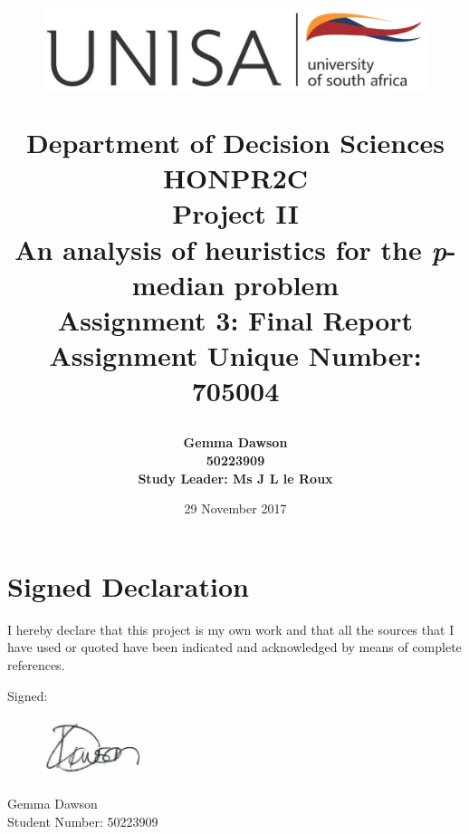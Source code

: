 \documentclass[11pt]{article}
\newcommand{\np}{\newpage}
\begin{document}
	\title{
		\begin{figure}[!htb]
			\begin{center}
				\includegraphics[width=12cm]{unisa.png}
			\end{center}
		\end{figure}
		Department of Decision Sciences\\[3mm]
		HONPR2C\\
		Project II \\[2cm]		
		{\Huge \textbf{An analysis of heuristics for the \emph{p}-median problem}}\\[15mm]
		Assignment 3: Final Report\\[3mm]
		Assignment Unique Number: 705004\\[2cm]
	}
	\author{\textbf{\Large Gemma Dawson}\\[3mm]
		\textbf{\Large 50223909}\\[3mm]
		\textbf{Study Leader: Ms J L le Roux}
	}
	\date{\Large 29 November 2017}	
	\maketitle
	\thispagestyle{empty}
	\np
	
	\section*{Signed Declaration}
	I hereby declare that this project is my own work and that all the sources that I have used or quoted have been indicated and acknowledged by means of complete references.
	
	Signed:
	\begin{figure}[!htb]
			\includegraphics[width=3cm]{signature.png}
	\end{figure}

	Gemma Dawson\\
	Student Number: 50223909\\
	
	
	\thispagestyle{empty}
	\np
	
\end{document}
